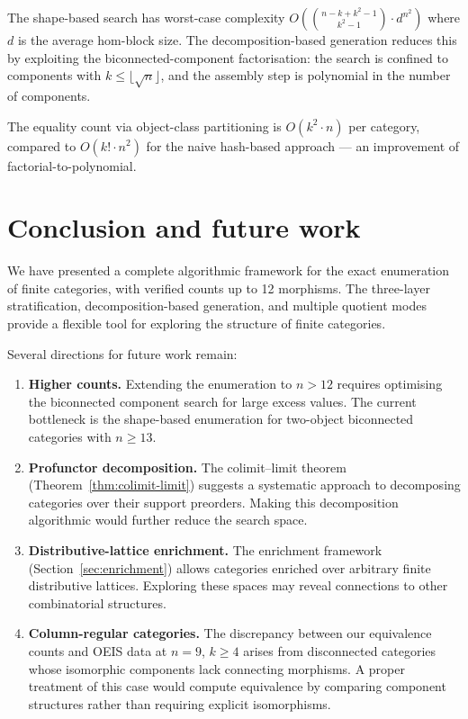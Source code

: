 \documentclass[12pt,a4paper]{amsart}
\theoremstyle{definition}
\theoremstyle{remark}
\begin{document}
The shape-based search has worst-case complexity
$O(\binom{n-k+k^2-1}{k^2-1} \cdot d^{n^2})$ where $d$ is the average
hom-block size.  The decomposition-based generation reduces this by
exploiting the biconnected-component factorisation: the search is
confined to components with $k \leq \lfloor\sqrt{n}\rfloor$, and the
assembly step is polynomial in the number of components.

The equality count via object-class partitioning is $O(k^2 \cdot n)$ per
category, compared to $O(k! \cdot n^2)$ for the naive hash-based approach
--- an improvement of factorial-to-polynomial.

\section{Conclusion and future work}
\label{sec:conclusion}

We have presented a complete algorithmic framework for the exact
enumeration of finite categories, with verified counts up to 12
morphisms.  The three-layer stratification, decomposition-based
generation, and multiple quotient modes provide a flexible tool for
exploring the structure of finite categories.

Several directions for future work remain:

\begin{enumerate}
\item \textbf{Higher counts.}  Extending the enumeration to $n > 12$
  requires optimising the biconnected component search for large excess
  values.  The current bottleneck is the shape-based enumeration for
  two-object biconnected categories with $n \geq 13$.
\item \textbf{Profunctor decomposition.}  The colimit--limit theorem
  (Theorem~\ref{thm:colimit-limit}) suggests a systematic approach to
  decomposing categories over their support preorders.  Making this
  decomposition algorithmic would further reduce the search space.
\item \textbf{Distributive-lattice enrichment.}  The enrichment framework
  (Section~\ref{sec:enrichment}) allows categories enriched over
  arbitrary finite distributive lattices.  Exploring these spaces may
  reveal connections to other combinatorial structures.
\item \textbf{Column-regular categories.}  The discrepancy between our
  equivalence counts and OEIS data at $n=9$, $k \geq 4$ arises from
  disconnected categories whose isomorphic components lack connecting
  morphisms.  A proper treatment of this case would compute equivalence
  by comparing component structures rather than requiring explicit
  isomorphisms.
\end{enumerate}
\end{document}
